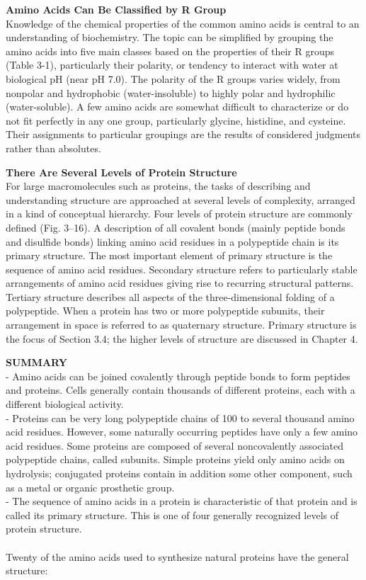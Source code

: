 \textbf{Amino Acids Can Be Classified by R Group}\\
Knowledge of the chemical properties of the common amino acids is central to an understanding of biochemistry. The topic can be simplified by grouping the amino acids into five main classes based on the properties of their R groups (Table 3-1), particularly their polarity, or tendency to interact with water at biological pH (near pH 7.0). The polarity of the R groups varies widely, from nonpolar and hydrophobic (water-insoluble) to highly polar and hydrophilic (water-soluble). A few amino acids are somewhat difficult to characterize or do not fit perfectly in any one group, particularly glycine, histidine, and cysteine. Their assignments to particular groupings are the results of considered judgments rather than absolutes.


\textbf{There Are Several Levels of Protein Structure}\\
For large macromolecules such as proteins, the tasks of describing and understanding structure are approached at several levels of complexity, arranged in a kind of conceptual hierarchy. Four levels of protein structure are commonly defined (Fig. 3–16). A description of all covalent bonds (mainly peptide bonds and disulfide bonds) linking amino acid residues in a polypeptide chain is its primary structure. The most important element of primary structure is the sequence of amino acid residues. Secondary structure refers to particularly stable arrangements of amino acid residues giving rise to recurring structural patterns. Tertiary structure describes all aspects of the three-dimensional folding of a polypeptide. When a protein has two or more polypeptide subunits, their arrangement in space is referred to as quaternary structure. Primary structure is the focus of Section 3.4; the higher levels of structure are discussed in Chapter 4.

\textbf{SUMMARY}\\
- Amino acids can be joined covalently through peptide bonds to form peptides and proteins. Cells generally contain thousands of different proteins, each with a different biological activity.\\
- Proteins can be very long polypeptide chains of 100 to several thousand amino acid residues. However, some naturally occurring peptides have only a few amino acid residues. Some proteins are composed of several noncovalently associated polypeptide chains, called subunits. Simple proteins yield only amino acids on hydrolysis; conjugated proteins contain in addition some other component, such as a metal or organic prosthetic group.\\
- The sequence of amino acids in a protein is characteristic of that protein and is called its primary structure. This is one of four generally recognized levels of protein structure.
\cite{nelson2008lehninger}\\
\\
Twenty of the amino acids used to synthesize natural proteins have the general structure:

